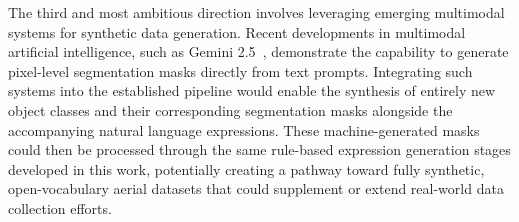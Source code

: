 The third and most ambitious direction involves leveraging emerging multimodal systems for synthetic data generation. Recent developments in multimodal artificial intelligence, such as Gemini 2.5~\cite{gemini25}, demonstrate the capability to generate pixel-level segmentation masks directly from text prompts. Integrating such systems into the established pipeline would enable the synthesis of entirely new object classes and their corresponding segmentation masks alongside the accompanying natural language expressions. These machine-generated masks could then be processed through the same rule-based expression generation stages developed in this work, potentially creating a pathway toward fully synthetic, open-vocabulary aerial datasets that could supplement or extend real-world data collection efforts.